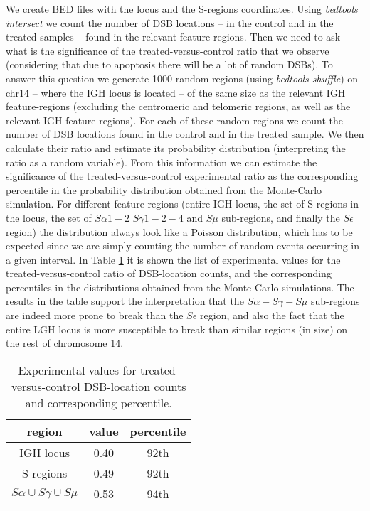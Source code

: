 \documentclass[11pt,a4paper]{article}
\begin{document}
We create BED files with the locus and the S-regions coordinates. Using {\it bedtools intersect} we count the number of DSB locations -- in the control and in the treated samples -- found in the relevant feature-regions. Then we need to ask what is the significance of the treated-versus-control ratio that we observe (considering that due to apoptosis there will be a lot of random DSBs). To answer this question we generate 1000 random regions (using {\it bedtools shuffle}) on chr14 -- where the IGH locus is located -- of the same size as the relevant IGH feature-regions (excluding the centromeric and telomeric regions, as well as the relevant IGH feature-regions). For each of these random regions we count the number of DSB locations found in the control and in the treated sample. We then calculate their ratio and estimate its probability distribution (interpreting the ratio as a random variable). From this information we can estimate the significance of the treated-versus-control experimental ratio as the corresponding percentile in the probability distribution obtained from the Monte-Carlo simulation. For different feature-regions (entire IGH locus, the set of S-regions in the locus, the set of $S\alpha1-2$ $S\gamma1-2-4$ and $S\mu$ sub-regions, and finally the $S\epsilon$ region) the distribution always look like a Poisson distribution, which has to be expected since we are simply counting the number of random events occurring in a given interval. In Table \ref{tab:rm90_IGH_enrichment} it is shown the list of experimental values for the treated-versus-control ratio of DSB-location counts, and the corresponding percentiles in the distributions obtained from the Monte-Carlo simulations. The results in the table support the interpretation that the $S\alpha-S\gamma-S\mu$ sub-regions are indeed more prone to break than the $S\epsilon$ region, and also the fact that the entire LGH locus is more susceptible to break than similar regions (in size) on the rest of chromosome 14.

\begin{table}
\centering
\begin{tabular}{|c|c|c|}
\hline 
region & value & percentile \\ 
\hline 
IGH locus & 0.40 & 92th \\ 
\hline 
S-regions & 0.49 & 92th \\ 
\hline 
$S\alpha \cup S\gamma \cup S\mu$ & 0.53 & 94th \\ 
\hline 
\end{tabular} 
\caption{Experimental values for treated-versus-control DSB-location counts and corresponding percentile.}
\label{tab:rm90_IGH_enrichment}
\end{table}
\end{document}
